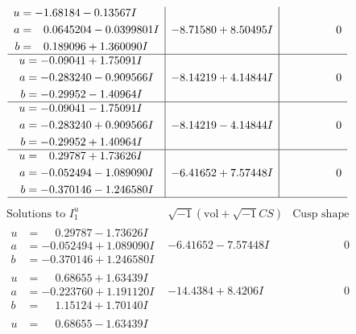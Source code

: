 \documentclass[1p]{elsarticle_modified}
\theoremstyle{definition}
\newcommand{\I}{\sqrt{-1}}
\begin{document}
$$\begin{array}{c|c|c}
\begin{aligned}
u &= -1.68184 - 0.13567 I \\
a &= \phantom{-}0.0645204 - 0.0399801 I \\
b &= \phantom{-}0.189096 + 1.360090 I\end{aligned}
 & -8.71580 + 8.50495 I & \phantom{-0.000000 } 0 \\ \hline\begin{aligned}
u &= -0.09041 + 1.75091 I \\
a &= -0.283240 - 0.909566 I \\
b &= -0.29952 - 1.40964 I\end{aligned}
 & -8.14219 + 4.14844 I & \phantom{-0.000000 } 0 \\ \hline\begin{aligned}
u &= -0.09041 - 1.75091 I \\
a &= -0.283240 + 0.909566 I \\
b &= -0.29952 + 1.40964 I\end{aligned}
 & -8.14219 - 4.14844 I & \phantom{-0.000000 } 0 \\ \hline\begin{aligned}
u &= \phantom{-}0.29787 + 1.73626 I \\
a &= -0.052494 - 1.089090 I \\
b &= -0.370146 - 1.246580 I\end{aligned}
 & -6.41652 + 7.57448 I & \phantom{-0.000000 } 0\\
 \hline 
 \end{array}$$\newpage$$\begin{array}{c|c|c}  
\text{Solutions to }I^u_{1}& \I (\text{vol} + \sqrt{-1}CS) & \text{Cusp shape}\\
 \hline 
\begin{aligned}
u &= \phantom{-}0.29787 - 1.73626 I \\
a &= -0.052494 + 1.089090 I \\
b &= -0.370146 + 1.246580 I\end{aligned}
 & -6.41652 - 7.57448 I & \phantom{-0.000000 } 0 \\ \hline\begin{aligned}
u &= \phantom{-}0.68655 + 1.63439 I \\
a &= -0.223760 + 1.191120 I \\
b &= \phantom{-}1.15124 + 1.70140 I\end{aligned}
 & -14.4384 + 8.4206 I & \phantom{-0.000000 } 0 \\ \hline\begin{aligned}
u &= \phantom{-}0.68655 - 1.63439 I \\

\end{aligned}
\end{array}$$
\end{document}
